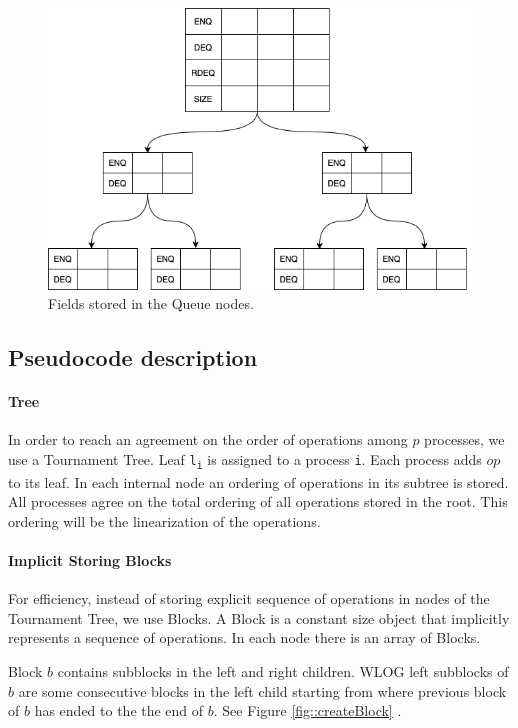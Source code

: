 \documentclass[10pt]{article}
\theoremstyle{definition}
\begin{document}
\begin{figure}[hbt]
\centering
  \includegraphics[width=5in]{pics/queue}
  \caption{Fields stored in the Queue nodes. \label{fig::queue}}
\end{figure}



\pagebreak

\subsection{Pseudocode description}

\paragraph{Tree}
In order to reach an agreement on the order of operations among $p$ processes, we use a Tournament Tree. Leaf \texttt{l\textsubscript{i}} is assigned to a process \texttt{i}. Each process adds $op$ to its leaf. In each internal node an ordering of operations in its subtree is stored. All processes agree on the total ordering of all operations stored in the root. This ordering will be the linearization of the operations.
\paragraph{Implicit Storing Blocks}
For efficiency, instead of storing explicit sequence of operations in nodes of the Tournament Tree, we use Blocks. A Block is a constant size object that implicitly represents a sequence of operations. In each node there is an array of Blocks.

Block $b$ contains subblocks in the left and right children. WLOG left subblocks of $b$ are some consecutive blocks in the left child starting from where previous block of $b$ has ended to the the end of $b$. See Figure \ref{fig::createBlock} .
\end{document}
